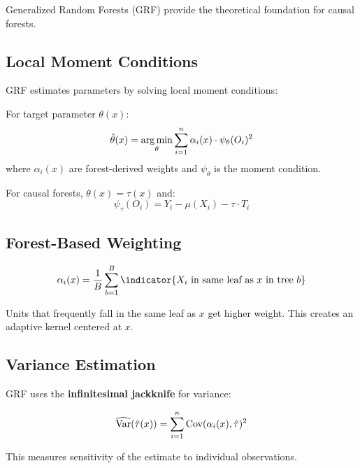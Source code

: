 Generalized Random Forests (GRF) provide the theoretical foundation for causal forests.

\subsection{Local Moment Conditions}

GRF estimates parameters by solving local moment conditions:

\begin{definition}
For target parameter $\theta(x)$:
\begin{equation}
\hat{\theta}(x) = \operatorname*{arg\,min}_\theta \sum_{i=1}^{n} \alpha_i(x) \cdot \psi_\theta(O_i)^2
\end{equation}
where $\alpha_i(x)$ are forest-derived weights and $\psi_\theta$ is the moment condition.
\end{definition}

For causal forests, $\theta(x) = \tau(x)$ and:
\begin{equation}
\psi_\tau(O_i) = Y_i - \mu(X_i) - \tau \cdot T_i
\end{equation}

\subsection{Forest-Based Weighting}

\begin{definition}
\begin{equation}
\alpha_i(x) = \frac{1}{B}\sum_{b=1}^{B} \indicator{X_i \text{ in same leaf as } x \text{ in tree } b}
\end{equation}
\end{definition}

Units that frequently fall in the same leaf as $x$ get higher weight. This creates an adaptive kernel centered at $x$.

\subsection{Variance Estimation}

GRF uses the \textbf{infinitesimal jackknife} for variance:

\begin{equation}
\widehat{\mathrm{Var}}(\hat{\tau}(x)) = \sum_{i=1}^{n} \text{Cov}(\alpha_i(x), \hat{\tau})^2
\end{equation}

This measures sensitivity of the estimate to individual observations.

